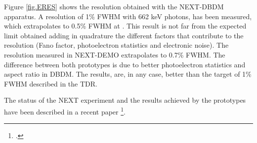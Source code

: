 Figure \ref{fig.ERES} shows the resolution obtained with the NEXT-DBDM apparatus. A resolution of 1\% FWHM with 
662 keV photons, has been measured, which extrapolates to 0.5\% FWHM at \Qbb. This result is not far from the expected limit obtained adding in quadrature the different factors that contribute to the resolution (Fano factor, photoelectron statistics and electronic noise). The resolution measured in NEXT-DEMO extrapolates to 0.7\% FWHM. The difference between both prototypes is due to better photoelectron statistics and aspect ratio in DBDM. The results, are, in any case, better than the target of 1\% FWHM described in the TDR.

The status of the NEXT experiment and the results achieved by the prototypes have been described in a recent
paper \footcite{Gomez-Cadenas:2013lta}.

